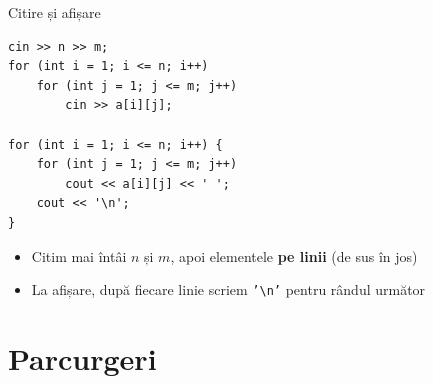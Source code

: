 \documentclass{beamer}
\begin{document}
\begin{frame}[fragile]{Citire și afișare}
  \begin{lstlisting}
cin >> n >> m;
for (int i = 1; i <= n; i++)
    for (int j = 1; j <= m; j++)
        cin >> a[i][j];

for (int i = 1; i <= n; i++) {
    for (int j = 1; j <= m; j++)
        cout << a[i][j] << ' ';
    cout << '\n';
}
  \end{lstlisting}

  \begin{itemize}
    \item Citim mai întâi $n$ și $m$, apoi elementele \textbf{pe linii} (de sus în jos)
    \item La afișare, după fiecare linie scriem \texttt{'\textbackslash{}n'} pentru rândul următor
  \end{itemize}
\end{frame}

\section{Parcurgeri}
\end{document}
